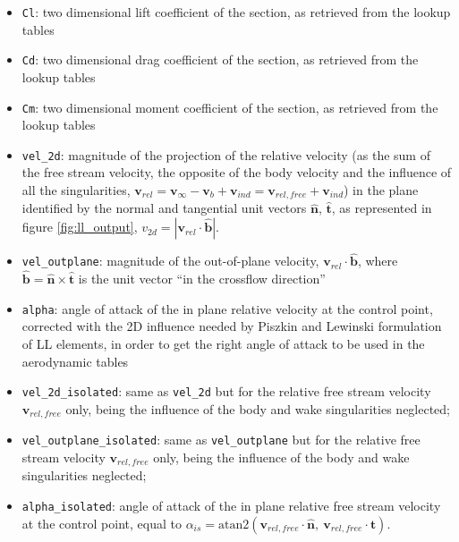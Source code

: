 \begin{itemize}
    \item \texttt{Cl}: two dimensional lift coefficient of the section, 
    as retrieved from the lookup tables
    \item \texttt{Cd}: two dimensional drag coefficient of the section, 
    as retrieved from the lookup tables
    \item \texttt{Cm}: two dimensional moment coefficient of the section, 
    as retrieved from the lookup tables
    \item \texttt{vel\_2d}: magnitude of the projection of the relative 
    velocity (as the sum of the free stream velocity, the opposite of 
    the body velocity and the influence of all the singularities, 
    $\mathbf{v}_{rel} = \mathbf{v}_\infty - \mathbf{v}_b + 
    \mathbf{v}_{ind} = \mathbf{v}_{rel,free} + \mathbf{v}_{ind}$) 
    in the plane identified by the normal and tangential unit vectors 
    $\mathbf{\hat{n}}$, $\mathbf{\hat{t}}$, as represented in figure \ref{fig:ll_output},
    $v_{2d} = | \mathbf{v}_{rel} \cdot \mathbf{\hat{b}}|$.
    \item \texttt{vel\_outplane}: magnitude of the out-of-plane velocity, 
    $\mathbf{v}_{rel} \cdot \mathbf{\hat{b}}$, where 
    $\mathbf{\hat{b}} = \mathbf{\hat{n}} \times \mathbf{\hat{t}}$ 
    is the unit vector ``in the crossflow direction''
    \item \texttt{alpha}: angle of attack of the in plane relative 
    velocity at the control point, corrected with the 2D influence 
    needed by Piszkin and Lewinski formulation of LL elements, 
    in order to get the right angle of attack to be used in the 
    aerodynamic tables
    \item \texttt{vel\_2d\_isolated}: same as \texttt{vel\_2d} but 
    for the relative free stream velocity $\mathbf{v}_{rel,free}$ only,
    being the influence of the body and wake singularities neglected;
    \item \texttt{vel\_outplane\_isolated}: same as \texttt{vel\_outplane} 
    but for the relative free stream velocity $\mathbf{v}_{rel,free}$ only, 
    being the influence of the body and wake singularities neglected;
    \item \texttt{alpha\_isolated}: angle of attack of the in plane relative 
    free stream velocity at the control point, equal to 
    $\alpha_{is} = \text{atan2}( \mathbf{v}_{rel,free} \cdot \mathbf{\hat{n}}, 
    \ \mathbf{v}_{rel,free} \cdot \mathbf{\hat{t}})$.
\end{itemize}

